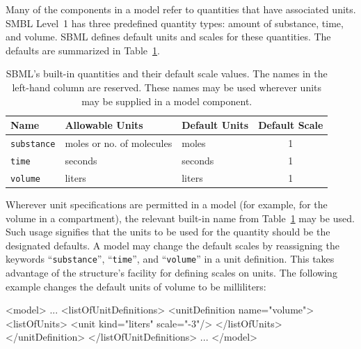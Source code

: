 \documentclass[10pt]{cekarticle}
\newcommand{\vref}[1]{\ref{#1}}
\begin{document}
Many of the components in a model refer to quantities that have associated
units.  SMBL Level~1 has three predefined quantity types: amount of
substance, time, and volume.  SBML defines default units and scales for
these quantities.  The defaults are summarized in Table~\vref{tab:builtin}.

\begin{table}[htb]
  \vspace*{8pt}
  \centering
  \begin{tabular}{lllc}
    \toprule
    \textbf{Name} & \textbf{Allowable Units} & \textbf{Default Units} & \textbf{Default Scale} \\
    \midrule
    \texttt{substance} & moles or no. of molecules & moles            & 1 \\
    \texttt{time}      & seconds                   & seconds          & 1 \\
    \texttt{volume}    & liters                    & liters           & 1 \\
    \bottomrule
  \end{tabular}
  \caption{SBML's built-in quantities and their default
    scale values.  The names in the left-hand column are reserved.  These
    names may be used wherever
    units may be supplied in a model component.}
  \label{tab:builtin}
\end{table}


Wherever unit specifications are permitted in a model (for example, for the
volume in a compartment), the relevant built-in name from
Table~\vref{tab:builtin} may be used.  Such usage signifies that the units
to be used for the quantity should be the designated defaults.  A model may
change the default scales by reassigning the keywords
``\texttt{substance}'', ``\texttt{time}'', and ``\texttt{volume}'' in a
unit definition.  This takes advantage of the 
structure's facility for defining scales on units.  The following example
changes the default units of volume to be milliliters:

\begin{example}
<model>
    ...
    <listOfUnitDefinitions>
        <unitDefinition name="volume">
            <listOfUnits>
                <unit kind="liters" scale="-3"/>
            </listOfUnits>                
        </unitDefinition>
    </listOfUnitDefinitions>
    ...
</model>
\end{example}
\end{document}
